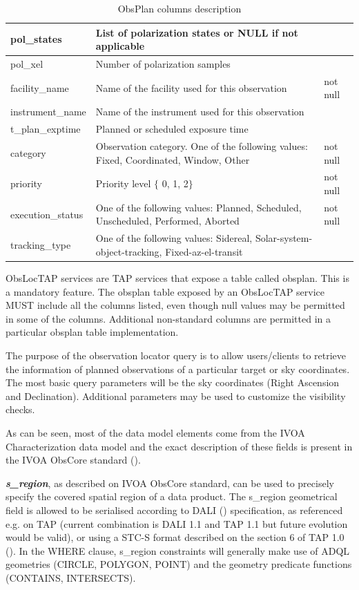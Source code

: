 \documentclass[11pt,a4paper]{ivoa}
\begin{document}
\begin{landscape}
\begin{table}
\begin{tabular}{ |l|l|l| }
\hline
pol\_states &
List of polarization states or NULL if not applicable &
\\
\hline
pol\_xel &
Number of polarization samples &
\\
\hline
facility\_name &
Name of the facility used for this observation &
not null\\
\hline
instrument\_name &
Name of the instrument used for this observation &
\\
\hline
t\_plan\_exptime &
Planned or scheduled exposure time &
\\
\hline
category &
Observation category. One of the following values: Fixed, Coordinated, Window, 
Other &
not null\\
\hline
priority &
Priority level $ \{ $ 0, 1, 2$ \} $ &
not null\\
\hline
execution\_status &
One of the following values:  Planned, Scheduled, Unscheduled, Performed, Aborted &
not null\\
\hline
tracking\_type &
One of the following values:  Sidereal, Solar-system-object-tracking, 
Fixed-az-el-transit &
\\
\hline
\end{tabular}
\caption{ObsPlan columns description}
\label{tab:obsplancolumns}
\end{table}
\end{landscape}

ObsLocTAP services are TAP services that expose a table called obsplan. This
is a mandatory feature. The obsplan table exposed by an ObsLocTAP service MUST
include all  the columns listed, even though null values may be permitted in
some of the columns. Additional non-standard columns are permitted in a 
particular obsplan table implementation.

The purpose of the observation locator query is to allow users/clients to
retrieve the information of planned observations of a particular target or
sky coordinates. The most basic query parameters will be the sky coordinates
(Right Ascension and Declination). Additional parameters may be used to
customize the visibility checks.

As can be seen, most of the data model elements come from the IVOA
Characterization data model and the exact description of these fields is
present in the IVOA ObsCore standard (\citealt{2017ivoa.spec.0509L}).

\textbf{\textit{s\_region}}, as described on IVOA ObsCore standard, can be
used to precisely specify the covered spatial region of a data product. The
s\_region geometrical field is allowed to be serialised according to DALI
(\citealt{std:DALI11}) specification, as referenced e.g. on TAP (current combination is DALI 1.1 and TAP 1.1 but future evolution would be valid), 
or using a STC-S format described on the section 6 of TAP 1.0 
(\citealt{2011ivoa.spec.1028T}). In the WHERE clause, s\_region constraints will generally make use of ADQL geometries (CIRCLE, POLYGON, POINT) and the geometry predicate functions (CONTAINS, INTERSECTS).
\end{document}
